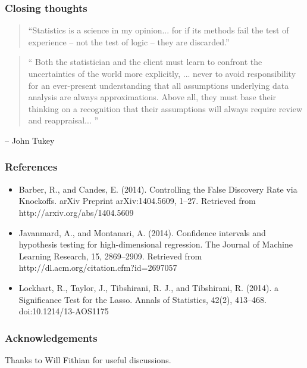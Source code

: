 \documentclass{beamer}
\begin{document}
\begin{frame}
\frametitle{Closing thoughts}
\begin{quotation}
``Statistics is a science in my opinion... for if its methods fail the
  test of experience -- not the test of logic -- they are discarded.''
\end{quotation}
\begin{quotation}
`` Both the statistician and the client must learn to confront the
  uncertainties of the world more explicitly, ... never to avoid
  responsibility for an ever-present understanding that all
  assumptions underlying data analysis are always approximations.
  Above all, they must base their thinking on a recognition that their
  assumptions will always require review and reappraisal...  ''
\end{quotation}
\hfill -- John Tukey
\end{frame}

\begin{frame}
\frametitle{References}
\begin{itemize}
\item Barber, R., and Candes, E. (2014). Controlling the False Discovery Rate via Knockoffs. arXiv Preprint arXiv:1404.5609, 1–27. Retrieved from http://arxiv.org/abs/1404.5609
\item Javanmard, A., and Montanari, A. (2014). Confidence intervals and hypothesis testing for high-dimensional regression. The Journal of Machine Learning Research, 15, 2869–2909. Retrieved from http://dl.acm.org/citation.cfm?id=2697057
\item Lockhart, R., Taylor, J., Tibshirani, R. J., and Tibshirani, R. (2014). a Significance Test for the Lasso. Annals of Statistics, 42(2), 413–468. doi:10.1214/13-AOS1175
\end{itemize}
\end{frame}


\begin{frame}
\frametitle{Acknowledgements}
Thanks to Will Fithian for useful discussions.
\end{frame}
\end{document}

